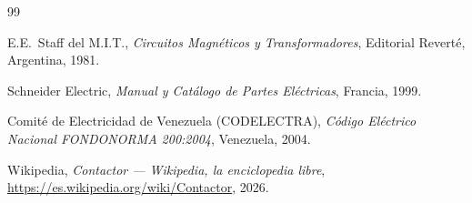 \documentclass[12pt,a4paper]{article}
\begin{document}


\tableofcontents
\newpage







\clearpage
\begin{thebibliography}{99}

E.E.~Staff del M.I.T., \textit{Circuitos Magnéticos y Transformadores}, Editorial Reverté, Argentina, 1981.

Schneider Electric, \textit{Manual y Catálogo de Partes Eléctricas}, Francia, 1999.

Comité de Electricidad de Venezuela (CODELECTRA), \textit{Código Eléctrico Nacional FONDONORMA 200:2004}, Venezuela, 2004.

Wikipedia, \textit{Contactor --- Wikipedia, la enciclopedia libre}, \url{https://es.wikipedia.org/wiki/Contactor}, 2026.

\end{thebibliography}
\end{document}
